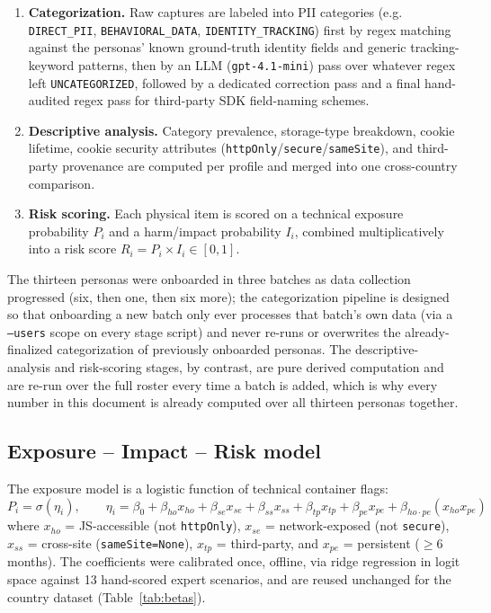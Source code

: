 \documentclass[11pt,a4paper]{article}
\newcommand{\code}[1]{\texttt{#1}}
\begin{document}
\begin{enumerate}[label=\textbf{Stage \arabic*.}, leftmargin=2.2cm]
  \item \textbf{Categorization.} Raw captures are labeled into PII categories
    (e.g. \code{DIRECT\_PII}, \code{BEHAVIORAL\_DATA}, \code{IDENTITY\_TRACKING})
    first by regex matching against the personas' known ground-truth identity
    fields and generic tracking-keyword patterns, then by an LLM
    (\code{gpt-4.1-mini}) pass over whatever regex left \code{UNCATEGORIZED},
    followed by a dedicated correction pass and a final hand-audited regex
    pass for third-party SDK field-naming schemes.
  \item \textbf{Descriptive analysis.} Category prevalence, storage-type
    breakdown, cookie lifetime, cookie security attributes
    (\code{httpOnly}/\code{secure}/\code{sameSite}), and third-party
    provenance are computed per profile and merged into one cross-country
    comparison.
  \item \textbf{Risk scoring.} Each physical item is scored on a technical
    exposure probability $P_i$ and a harm/impact probability $I_i$, combined
    multiplicatively into a risk score $R_i = P_i \times I_i \in [0,1]$.
\end{enumerate}

The thirteen personas were onboarded in three batches as data collection
progressed (six, then one, then six more); the categorization pipeline is
designed so that onboarding a new batch only ever processes that batch's own
data (via a \code{--users} scope on every stage script) and never re-runs or
overwrites the already-finalized categorization of previously onboarded
personas. The descriptive-analysis and risk-scoring stages, by contrast, are
pure derived computation and are re-run over the full roster every time a
batch is added, which is why every number in this document is already
computed over all thirteen personas together.

\subsection{Exposure -- Impact -- Risk model}

The exposure model is a logistic function of technical container flags:
\begin{equation}
P_i = \sigma(\eta_i), \qquad
\eta_i = \beta_0 + \beta_{ho} x_{ho} + \beta_{se} x_{se} + \beta_{ss} x_{ss}
       + \beta_{tp} x_{tp} + \beta_{pe} x_{pe} + \beta_{ho\cdot pe}(x_{ho} x_{pe})
\end{equation}
where $x_{ho}$ = JS-accessible (not \code{httpOnly}), $x_{se}$ = network-exposed
(not \code{secure}), $x_{ss}$ = cross-site (\code{sameSite=None}), $x_{tp}$ =
third-party, and $x_{pe}$ = persistent ($\geq 6$ months). The coefficients were
calibrated once, offline, via ridge regression in logit space against 13
hand-scored expert scenarios, and are reused unchanged for the country
dataset (Table~\ref{tab:betas}).
\end{document}
